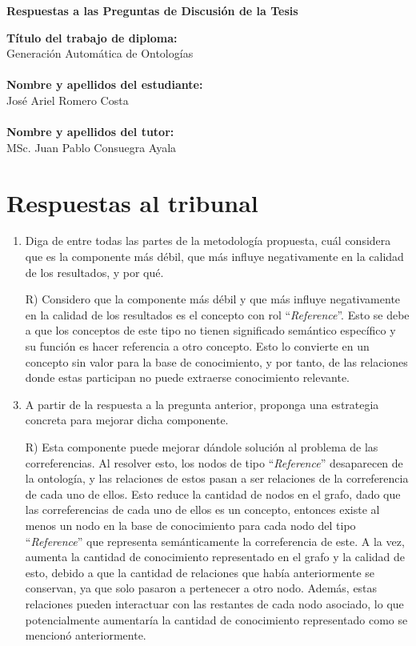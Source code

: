 \documentclass[12pt,oneside]{article}
\newcommand{\doublequote}[1]{``#1''}
\begin{document}
	\begin{center}
		\huge\bf
		Respuestas a las Preguntas de Discusión de la Tesis
	\end{center}

	\vspace{0.4in}
	\noindent\textbf{\Large Título del trabajo de diploma:}\\
	\large Generación Automática de Ontologías\\\\
	\textbf{\Large Nombre y apellidos del estudiante:}\\
	\large José Ariel Romero Costa\\\\
	\textbf{\Large Nombre y apellidos del tutor:}\\
	\large MSc. Juan Pablo Consuegra Ayala

	\vspace{0.2in}
	\section{Respuestas al tribunal}
	\begin{enumerate}
		\item Diga de entre todas las partes de la metodología propuesta, cuál considera que es la componente más débil, que más influye negativamente en la calidad de los resultados, y por qué.

		\item[R)] Considero que la componente más débil y que más influye negativamente en la calidad de los resultados es el concepto con rol \doublequote{\textit{Reference}}. Esto se debe a que los conceptos de este tipo no tienen significado semántico específico y su función es hacer referencia a otro concepto. Esto lo convierte en un concepto sin valor para la base de conocimiento, y por tanto, de las relaciones donde estas participan no puede extraerse conocimiento relevante.

		\item A partir de la respuesta a la pregunta anterior, proponga una estrategia concreta para mejorar dicha componente.

		\item[R)] Esta componente puede mejorar dándole solución al problema de las correferencias. Al resolver esto, los nodos de tipo \doublequote{\textit{Reference}} desaparecen de la ontología, y las relaciones de estos pasan a ser relaciones de la correferencia de cada uno de ellos. Esto reduce la cantidad de nodos en el grafo, dado que las correferencias de cada uno de ellos es un concepto, entonces existe al menos un nodo en la base de conocimiento para cada nodo del tipo \doublequote{\textit{Reference}} que representa semánticamente la correferencia de este. A la vez, aumenta la cantidad de conocimiento representado en el grafo y la calidad de esto, debido a que la cantidad de relaciones que había anteriormente se conservan, ya que solo pasaron a pertenecer a otro nodo. Además, estas relaciones pueden interactuar con las restantes de cada nodo asociado, lo que potencialmente aumentaría la cantidad de conocimiento representado como se mencionó anteriormente.
	\end{enumerate}
\end{document}
